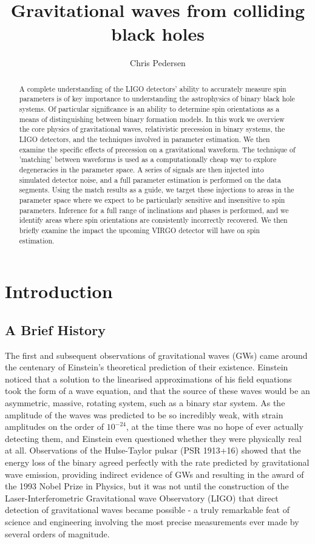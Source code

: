 \documentclass[11pt]{article}
\title{Gravitational waves from colliding black holes}
\author{Chris Pedersen}
\begin{document}
\maketitle
\begin{abstract}
A complete understanding of the LIGO detectors' ability to accurately measure spin parameters is of key importance to understanding the astrophysics of binary black hole systems. Of particular significance is an ability to determine spin orientations as a means of distinguishing between binary formation models. In this work we overview the core physics of gravitational waves, relativistic precession in binary systems, the LIGO detectors, and the techniques involved in parameter estimation. We then examine the specific effects of precession on a gravitational waveform. The technique of 'matching' between waveforms is used as a computationally cheap way to explore degeneracies in the parameter space. A series of signals are then injected into simulated detector noise, and a full parameter estimation is performed on the data segments. Using the match results as a guide, we target these injections to areas in the parameter space where we expect to be particularly sensitive and insensitive to spin parameters. Inference for a full range of inclinations and phases is performed, and we identify areas where spin orientations are consistently incorrectly recovered. We then briefly examine the impact the upcoming VIRGO detector will have on spin estimation.
\end{abstract}
\tableofcontents
\newpage

\section{Introduction}
\subsection{A Brief History}
The first\cite{obs} and subsequent\cite{obs2} observations of gravitational waves (GWs) came around the centenary of Einstein's theoretical prediction of their existence\cite{eins1}\cite{eins2}. Einstein noticed that a solution to the linearised approximations of his field equations took the form of a wave equation\cite{gw1}, and that the source of these waves would be an asymmetric, massive, rotating system, such as a binary star system. As the amplitude of the waves was predicted to be so incredibly weak, with strain amplitudes on the order of $10^{-24}$, at the time there was no hope of ever actually detecting them, and Einstein even questioned whether they were physically real at all\cite{eins3}. Observations of the Hulse-Taylor pulsar (PSR 1913+16)\cite{hulse} showed that the energy loss of the binary agreed perfectly with the rate predicted by gravitational wave emission, providing indirect evidence of GWs and resulting in the award of the 1993 Nobel Prize in Physics, but it was not until the construction of the Laser-Interferometric Gravitational wave Observatory (LIGO) that direct detection of gravitational waves became possible - a truly remarkable feat of science and engineering involving the most precise measurements ever made by several orders of magnitude.
\end{document}
